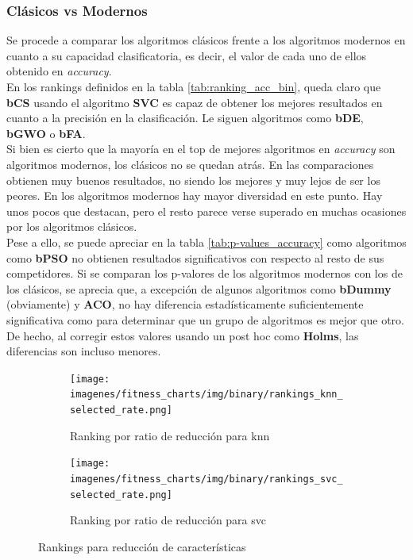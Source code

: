 \subsubsection{Clásicos vs Modernos}
Se procede a comparar los algoritmos clásicos frente a los algoritmos modernos en cuanto a su capacidad clasificatoria, es decir, el valor de cada uno de ellos obtenido en \textit{accuracy}.\\[6pt]

En los rankings definidos en la tabla \ref{tab:ranking_acc_bin}, queda claro que \textbf{bCS} usando el algoritmo \textbf{SVC} es capaz de obtener los mejores resultados en cuanto a la precisión en la clasificación. Le siguen algoritmos como \textbf{bDE}, \textbf{bGWO} o \textbf{bFA}.\\[6pt]

Si bien es cierto que la mayoría en el top de mejores algoritmos en \textit{accuracy} son algoritmos modernos, los clásicos no se quedan atrás. En las comparaciones obtienen muy buenos resultados, no siendo los mejores y muy lejos de ser los peores. En los algoritmos modernos hay mayor diversidad en este punto. Hay unos pocos que destacan, pero el resto parece verse superado en muchas ocasiones por los algoritmos clásicos.\\[6pt]

Pese a ello, se puede apreciar en la tabla \ref{tab:p-values_accuracy} como algoritmos como \textbf{bPSO} no obtienen resultados significativos con respecto al resto de sus competidores. Si se comparan los p-valores de los algoritmos modernos con los de los clásicos, se aprecia que, a excepción de algunos algoritmos como \textbf{bDummy} (obviamente) y \textbf{ACO}, no hay diferencia estadísticamente suficientemente significativa como para determinar que un grupo de algoritmos es mejor que otro. De hecho, al corregir estos valores usando un post hoc como \textbf{Holms}, las diferencias son incluso menores.\\[6pt]

\begin{figure}[htp]
    \centering
    \begin{subfigure}[b]{1\textwidth}
        \texttt{[image: imagenes/fitness\_charts/img/binary/rankings\_knn\_selected\_rate.png]}
        \caption{Ranking por ratio de reducción para knn}
        \label{fig:ranking_knn_red}
    \end{subfigure}
    \begin{subfigure}[b]{1\textwidth}
        \texttt{[image: imagenes/fitness\_charts/img/binary/rankings\_svc\_selected\_rate.png]}
        \caption{Ranking por ratio de reducción para svc}
        \label{fig:ranking_svc_red}
    \end{subfigure}
    \caption{Rankings para reducción de características}
    \label{fig:rankings_red}
\end{figure}

